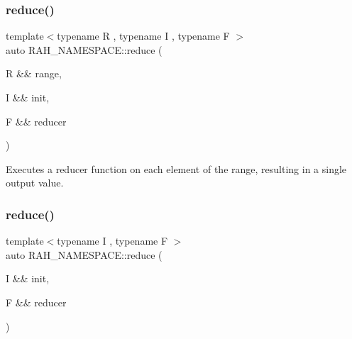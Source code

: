 \mbox{\label{namespace_r_a_h___n_a_m_e_s_p_a_c_e_ae1f989f80f1fe3bf2eac4106e5d6fe35}} 
\subsubsection{\texorpdfstring{reduce()}{reduce()}\hspace{0.1cm}{\footnotesize\ttfamily [1/2]}}
{\footnotesize\ttfamily template$<$typename R , typename I , typename F $>$ \\
auto R\+A\+H\+\_\+\+N\+A\+M\+E\+S\+P\+A\+C\+E\+::reduce (\begin{DoxyParamCaption}\item[{R \&\&}]{range,  }\item[{I \&\&}]{init,  }\item[{F \&\&}]{reducer }\end{DoxyParamCaption})}



Executes a reducer function on each element of the range, resulting in a single output value. 


\begin{DoxyCodeInclude}{0}
\end{DoxyCodeInclude}
\mbox{\label{namespace_r_a_h___n_a_m_e_s_p_a_c_e_ad5beb1dcde4f4782304a4e3688b1851a}} 
\subsubsection{\texorpdfstring{reduce()}{reduce()}\hspace{0.1cm}{\footnotesize\ttfamily [2/2]}}
{\footnotesize\ttfamily template$<$typename I , typename F $>$ \\
auto R\+A\+H\+\_\+\+N\+A\+M\+E\+S\+P\+A\+C\+E\+::reduce (\begin{DoxyParamCaption}\item[{I \&\&}]{init,  }\item[{F \&\&}]{reducer }\end{DoxyParamCaption})}



